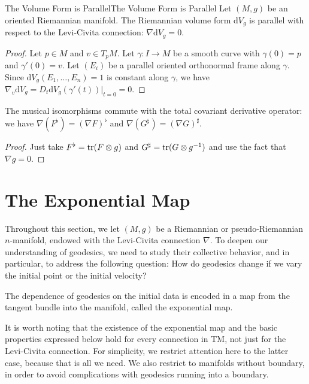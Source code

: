 \documentclass[../main.tex]{subfiles}
\begin{document}
\begin{proposition}{The Volume Form is Parallel}{The Volume Form is Parallel}
	Let $(M, g)$ be an oriented Riemannian manifold. The Riemannian volume form $\mathrm{d} V_g$ is parallel with respect to the Levi-Civita connection: $\nabla \mathrm{d} V_g = 0$.
\end{proposition}
\begin{proof}
	Let $p\in M$ and $v\in T_p M$. Let $\gamma: I \to M$ be a smooth curve with $\gamma(0) = p$ and $\gamma'(0) = v$. Let $(E_i)$ be a parallel oriented orthonormal frame along $\gamma$. Since $\mathrm{d} V_g(E_1, \ldots, E_n) = 1$ is constant along $\gamma$, we have $\nabla_v \mathrm{d} V_g = D_t \mathrm{d} V_g(\gamma'(t))|_{t=0} = 0$.
\end{proof}

\begin{proposition}{}{}
	The musical isomorphisms commute with the total covariant derivative operator: we have $\nabla(F^\flat) = (\nabla F)^\flat$ and $\nabla(G^\sharp) = (\nabla G)^\sharp$.
\end{proposition}
\begin{proof}
	Just take $F^\flat = \operatorname{tr} (F \otimes g)$ and $G^\sharp = \operatorname{tr} (G \otimes g^{-1})$ and use the fact that $\nabla g = 0$.
\end{proof}

\section{The Exponential Map}
Throughout this section, we let $(M, g)$ be a Riemannian or pseudo-Riemannian $n$-manifold, endowed with the Levi-Civita connection $\nabla$. To deepen our understanding of geodesics, we need to study their collective behavior, and in particular, to address the following question: How do geodesics change if we vary the initial point or the initial velocity?

The dependence of geodesics on the initial data is encoded in a map from the tangent bundle into the manifold, called the exponential map.

\begin{remark}
	It is worth noting that the existence of the exponential map and the basic properties expressed below hold for every connection in TM, not just for the Levi-Civita connection. For simplicity, we restrict attention here to the latter case, because that is all we need. We also restrict to manifolds without boundary, in order to avoid complications with geodesics running into a boundary.
\end{remark}
\end{document}
